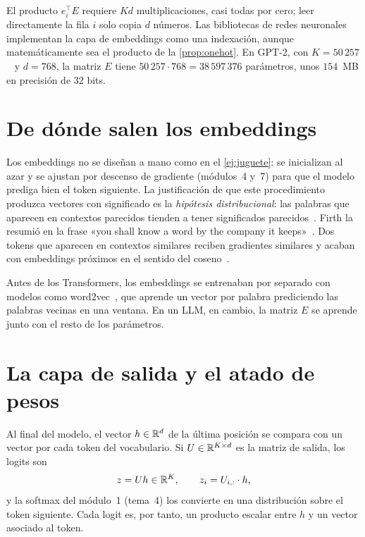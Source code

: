 \addtocounter{definicion}{1}%

\begin{observacion}
El producto $e_i^{\top}E$ requiere $Kd$ multiplicaciones, casi todas por cero; leer directamente la fila $i$ solo copia $d$ números. Las bibliotecas de redes neuronales implementan la capa de embeddings como una indexación, aunque matemáticamente sea el producto de la \cref{prop:onehot}. En GPT-2, con $K=50\,257$~\cite[§2.3]{radford} y $d=768$, la matriz $E$ tiene $50\,257\cdot 768=38\,597\,376$ parámetros, unos $154$~MB en precisión de 32 bits.
\end{observacion}

\section{De dónde salen los embeddings}

Los embeddings no se diseñan a mano como en el \cref{ej:juguete}: se inicializan al azar y se ajustan por descenso de gradiente (módulos~4 y~7) para que el modelo prediga bien el token siguiente. La justificación de que este procedimiento produzca vectores con significado es la \emph{hipótesis distribucional}: las palabras que aparecen en contextos parecidos tienden a tener significados parecidos~\cite{harris}. Firth la resumió en la frase «you shall know a word by the company it keeps»~\cite{firth}. Dos tokens que aparecen en contextos similares reciben gradientes similares y acaban con embeddings próximos en el sentido del coseno~\cite[cap.~5]{jm3}.

Antes de los Transformers, los embeddings se entrenaban por separado con modelos como word2vec~\cite{mikolov-a}, que aprende un vector por palabra prediciendo las palabras vecinas en una ventana. En un LLM, en cambio, la matriz $E$ se aprende junto con el resto de los parámetros.

\section{La capa de salida y el atado de pesos}

Al final del modelo, el vector $h\in\mathbb{R}^{d}$ de la última posición se compara con un vector por cada token del vocabulario. Si $U\in\mathbb{R}^{K\times d}$ es la matriz de salida, los logits son
\[
z=Uh\in\mathbb{R}^{K},\qquad z_i=U_{i,:}\cdot h,
\]
y la softmax del módulo~1 (tema~4) los convierte en una distribución sobre el token siguiente. Cada logit es, por tanto, un producto escalar entre $h$ y un vector asociado al token.

